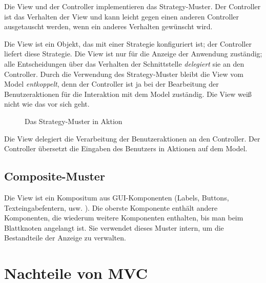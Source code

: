 \documentclass[11pt,a4paper,titlepage]{scrreprt}
\begin{document}
Die View und der Controller implementieren das Strategy-Muster. Der Controller ist das
Verhalten der View und kann leicht gegen einen anderen Controller ausgetauscht werden,
wenn ein anderes Verhalten gewünscht wird.

Die View ist ein Objekt, das mit einer Strategie konfiguriert ist; der Controller
liefert diese Strategie. Die View ist nur für die Anzeige der Anwendung zuständig;
alle Entscheidungen über das Verhalten der Schnittstelle {\itshape delegiert} sie an
den Controller. Durch die Verwendung des Strategy-Muster bleibt die View vom
Model {\itshape entkoppelt}, denn der Controller ist ja bei der Bearbeitung der
Benutzeraktionen für die Interaktion mit dem Model zuständig. Die View weiß nicht
wie das vor sich geht.

\begin{figure}[h]
\caption{Das Strategy-Muster in Aktion}
\end{figure}

Die View delegiert die Verarbeitung der Benutzeraktionen an den Controller. Der Controller
übersetzt die Eingaben des Benutzers in Aktionen auf dem Model.

\subsection{Composite-Muster}
Die View ist ein Kompositum aus GUI-Komponenten (Labels, Buttons, Texteingabefentern, usw. ).
Die oberste Komponente enthält andere Komponenten, die wiederum weitere Komponenten enthalten,
bis man beim Blattknoten angelangt ist. Sie verwendet dieses Muster intern, um die Bestandteile
der Anzeige zu verwalten.

\section{Nachteile von MVC}
\end{document}
